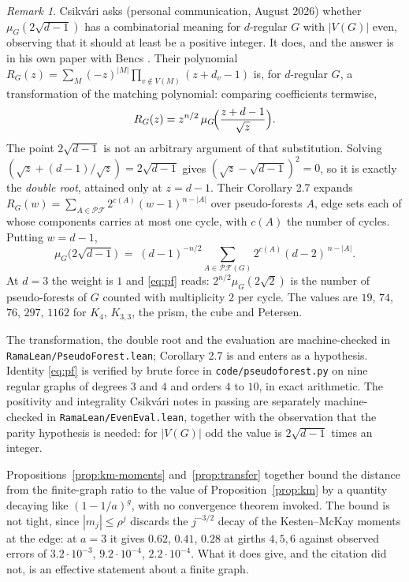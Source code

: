 \documentclass[11pt]{article}
\theoremstyle{remark}
\newtheorem{remark}[theorem]{Remark}
\begin{document}
\begin{remark}\label{rem:csik}
Csikv\'ari asks (personal communication, August 2026) whether $\mu_G(2\sqrt{d-1})$ has a
combinatorial meaning for $d$-regular $G$ with $|V(G)|$ even, observing that it should at
least be a positive integer. It does, and the answer is in his own paper with Bencs
\cite{BCs}. Their polynomial
$R_G(z)=\sum_{M}(-z)^{|M|}\prod_{v\notin V(M)}(z+d_v-1)$ is, for $d$-regular $G$, a
transformation of the matching polynomial: comparing coefficients termwise,
\[
R_G(z)=z^{n/2}\,\mu_G\!\Bigl(\frac{z+d-1}{\sqrt z}\Bigr).
\]
The point $2\sqrt{d-1}$ is not an arbitrary argument of that substitution. Solving
$(\sqrt z+ (d-1)/\sqrt z)=2\sqrt{d-1}$ gives $(\sqrt z-\sqrt{d-1})^2=0$, so it is exactly
the \emph{double root}, attained only at $z=d-1$. Their Corollary 2.7 expands
$R_G(w)=\sum_{A\in\mathcal{PF}}2^{c(A)}(w-1)^{n-|A|}$ over pseudo-forests $A$, edge sets each
of whose components carries at most one cycle, with $c(A)$ the number of cycles. Putting
$w=d-1$,
\begin{equation}\label{eq:pf}
\mu_G\bigl(2\sqrt{d-1}\bigr)\;=\;(d-1)^{-n/2}\sum_{A\in\mathcal{PF}(G)}2^{c(A)}(d-2)^{\,n-|A|}.
\end{equation}
At $d=3$ the weight is $1$ and \eqref{eq:pf} reads: $2^{n/2}\mu_G(2\sqrt2)$ is the number of
pseudo-forests of $G$ counted with multiplicity $2$ per cycle. The values are $19$, $74$,
$76$, $297$, $1162$ for $K_4$, $K_{3,3}$, the prism, the cube and Petersen.

The transformation, the double root and the evaluation are machine-checked in
\texttt{RamaLean/PseudoForest.lean}; Corollary 2.7 is \cite{BCs} and enters as a hypothesis.
Identity \eqref{eq:pf} is verified by brute force in \texttt{code/pseudoforest.py} on nine
regular graphs of degrees $3$ and $4$ and orders $4$ to $10$, in exact arithmetic. The
positivity and integrality Csikv\'ari notes in passing are separately machine-checked in
\texttt{RamaLean/EvenEval.lean}, together with the observation that the parity hypothesis is
needed: for $|V(G)|$ odd the value is $2\sqrt{d-1}$ times an integer.
\end{remark}

Propositions~\ref{prop:km-moments} and~\ref{prop:transfer} together bound the distance from
the finite-graph ratio to the value of Proposition~\ref{prop:km} by a quantity decaying
like $(1-1/a)^{g}$, with no convergence theorem invoked. The bound is not tight, since
$|m_j|\le\rho^j$ discards the $j^{-3/2}$ decay of the Kesten--McKay moments at the edge: at
$a=3$ it gives $0.62$, $0.41$, $0.28$ at girths $4,5,6$ against observed errors of
$3.2\cdot10^{-3}$, $9.2\cdot10^{-4}$, $2.2\cdot10^{-4}$. What it does give, and the
citation did not, is an effective statement about a finite graph.
\end{document}
